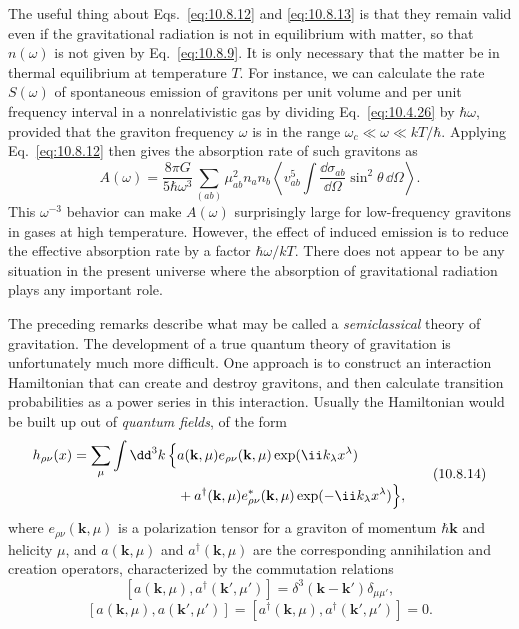 The useful thing about Eqs.~\eqref{eq:10.8.12} and \eqref{eq:10.8.13} is
that they remain valid even if the gravitational radiation is not in
equilibrium with matter, so that \(n(\omega)\) is not given by
Eq.~\eqref{eq:10.8.9}. It is only necessary that the matter be in thermal
equilibrium at temperature \(T\). For instance, we can calculate the rate
\(S(\omega)\) of spontaneous emission of gravitons per unit volume and per
unit frequency interval in a nonrelativistic gas by dividing
Eq.~\eqref{eq:10.4.26} by \(\hbar\omega\), provided that the graviton
frequency \(\omega\) is in the range
\(\omega_c\ll\omega\ll kT/\hbar\). Applying Eq.~\eqref{eq:10.8.12} then
gives the absorption rate of such gravitons as
\[
  A(\omega)
  =
  \frac{8\pi G}{5\hbar\omega^3}
  \sum_{(ab)}
  \mu_{ab}^2n_an_b
  \left\langle
    v_{ab}^5
    \int
    \frac{\dd\sigma_{ab}}{\dd\Omega}
    \sin^2\theta\,\dd\Omega
  \right\rangle.
\]
This \(\omega^{-3}\) behavior can make \(A(\omega)\) surprisingly large for
low-frequency gravitons in gases at high temperature. However, the effect of
induced emission is to reduce the effective absorption rate by a factor
\(\hbar\omega/kT\). There does not appear to be any situation in the present
universe where the absorption of gravitational radiation plays any important
role.

The preceding remarks describe what may be called a \emph{semiclassical}
theory of gravitation. The development of a true quantum theory of gravitation
is unfortunately much more difficult. One approach is to construct an
interaction Hamiltonian that can create and destroy gravitons, and then
calculate transition probabilities as a power series in this interaction.
Usually the Hamiltonian would be built up out of \emph{quantum fields}, of the
form
\begin{equation}
  \begin{split}
  h_{\rho\nu}(x)
  =
  \sum_\mu\int \dd^3k\,
  \Bigl\{
    &a(\mathbf{k},\mu)e_{\rho\nu}(\mathbf{k},\mu)
    \exp(\ii k_\lambda x^\lambda)
  \\
    &+
    a^\dagger(\mathbf{k},\mu)e_{\rho\nu}^*(\mathbf{k},\mu)
    \exp(-\ii k_\lambda x^\lambda)
  \Bigr\},
  \end{split}
  \tag{10.8.14}\label{eq:10.8.14}
\end{equation}
where \(e_{\rho\nu}(\mathbf{k},\mu)\) is a polarization tensor for a graviton
of momentum \(\hbar\mathbf{k}\) and helicity \(\mu\), and
\(a(\mathbf{k},\mu)\) and \(a^\dagger(\mathbf{k},\mu)\) are the
corresponding annihilation and creation operators, characterized by the
commutation relations
\begin{equation}
  \left[
    a(\mathbf{k},\mu),a^\dagger(\mathbf{k}',\mu')
  \right]
  =
  \delta^3(\mathbf{k}-\mathbf{k}')\delta_{\mu\mu'},
  \tag{10.8.15}\label{eq:10.8.15}
\end{equation}
\begin{equation}
  \left[
    a(\mathbf{k},\mu),a(\mathbf{k}',\mu')
  \right]
  =
  \left[
    a^\dagger(\mathbf{k},\mu),a^\dagger(\mathbf{k}',\mu')
  \right]
  =
  0.
  \tag{10.8.16}\label{eq:10.8.16}
\end{equation}

